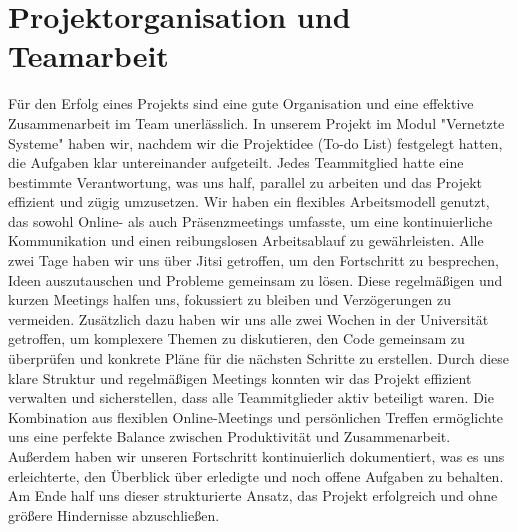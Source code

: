 \section{Projektorganisation und Teamarbeit }\label{einleitung}
Für den Erfolg eines Projekts sind eine gute Organisation und eine effektive Zusammenarbeit im Team unerlässlich. In unserem Projekt im Modul "Vernetzte Systeme" haben wir, nachdem wir die Projektidee (To-do List) festgelegt hatten, die Aufgaben klar untereinander aufgeteilt. Jedes Teammitglied hatte eine bestimmte Verantwortung, was uns half, parallel zu arbeiten und das Projekt effizient und zügig umzusetzen. Wir haben ein flexibles Arbeitsmodell genutzt, das sowohl Online- als auch Präsenzmeetings umfasste, um eine kontinuierliche Kommunikation und einen reibungslosen Arbeitsablauf zu gewährleisten. Alle zwei Tage haben wir uns über Jitsi getroffen, um den Fortschritt zu besprechen, Ideen auszutauschen und Probleme gemeinsam zu lösen. Diese regelmäßigen und kurzen Meetings halfen uns, fokussiert zu bleiben und Verzögerungen zu vermeiden. Zusätzlich dazu haben wir uns alle zwei Wochen in der Universität getroffen, um komplexere Themen zu diskutieren, den Code gemeinsam zu überprüfen und konkrete Pläne für die nächsten Schritte zu erstellen. Durch diese klare Struktur und regelmäßigen Meetings konnten wir das Projekt effizient verwalten und sicherstellen, dass alle Teammitglieder aktiv beteiligt waren. Die Kombination aus flexiblen Online-Meetings und persönlichen Treffen ermöglichte uns eine perfekte Balance zwischen Produktivität und Zusammenarbeit. Außerdem haben wir unseren Fortschritt kontinuierlich dokumentiert, was es uns erleichterte, den Überblick über erledigte und noch offene Aufgaben zu behalten. Am Ende half uns dieser strukturierte Ansatz, das Projekt erfolgreich und ohne größere Hindernisse abzuschließen.
